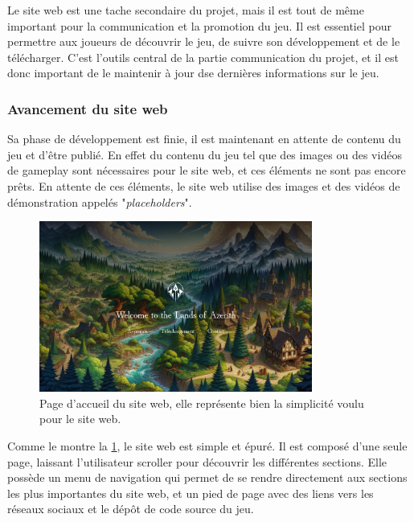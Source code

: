 
Le site web est une tache secondaire du projet, mais il est tout de même important pour la communication et la promotion du jeu.
Il est essentiel pour permettre aux joueurs de découvrir le jeu, de suivre son développement et de le télécharger.
C'est l'outils central de la partie communication du projet, et il est donc important de le maintenir à jour dse dernières informations sur le jeu.
\\

\subsubsection*{\hspace*{0.6cm}Avancement du site web}


Sa phase de développement est finie, il est maintenant en attente de contenu du jeu et d'être publié.
En effet du contenu du jeu tel que des images ou des vidéos de gameplay sont nécessaires pour le site web, et ces éléments ne sont pas encore prêts. En attente de ces éléments, le site web utilise des images et des vidéos de démonstration appelés "\textit{placeholders}".


\begin{figure}[H]
    \centering
    \includegraphics[width=0.8\textwidth]{2.game/assets/website1.png}
    \caption{Page d'accueil du site web, elle représente bien la simplicité voulu pour le site web.}
    \label{fig:website1}
\end{figure}

Comme le montre la \ref*{fig:website1}, le site web est simple et épuré. 
Il est composé d'une seule page, laissant l'utilisateur scroller pour découvrir les différentes sections.
Elle possède un menu de navigation qui permet de se rendre directement aux sections les plus importantes du site web, et un pied de page avec des liens vers les réseaux sociaux et le dépôt de code source du jeu.
\\

